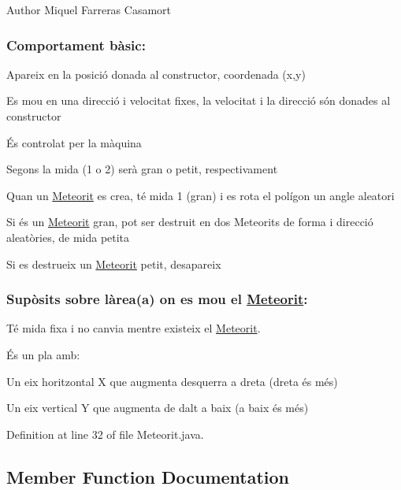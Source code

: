 \begin{DoxyAuthor}{Author}
Miquel Farreras Casamort
\end{DoxyAuthor}
\subsubsection*{Comportament bàsic\+: }


\begin{DoxyItemize}
\item Apareix en la posició donada al constructor, coordenada (x,y)
\item Es mou en una direcció i velocitat fixes, la velocitat i la direcció són donades al constructor
\item És controlat per la màquina
\item Segons la mida (1 o 2) serà gran o petit, respectivament
\item Quan un \hyperlink{class_meteorit}{Meteorit} es crea, té mida 1 (gran) i es rota el polígon un angle aleatori
\item Si és un \hyperlink{class_meteorit}{Meteorit} gran, pot ser destruit en dos Meteorits de forma i direcció aleatòries, de mida petita
\item Si es destrueix un \hyperlink{class_meteorit}{Meteorit} petit, desapareix
\end{DoxyItemize}

\subsubsection*{Supòsits sobre l\textquotesingle{}àrea(a) on es mou el \hyperlink{class_meteorit}{Meteorit}\+: }

Té mida fixa i no canvia mentre existeix el \hyperlink{class_meteorit}{Meteorit}.

És un pla amb\+:
\begin{DoxyItemize}
\item Un eix horitzontal X que augmenta d\textquotesingle{}esquerra a dreta (dreta és més)
\item Un eix vertical Y que augmenta de dalt a baix (a baix és més) 
\end{DoxyItemize}

Definition at line 32 of file Meteorit.\+java.



\subsection{Member Function Documentation}
\hypertarget{class_meteorit_a28f9530c5db8c8a192b272b8bd1114d2}{}
